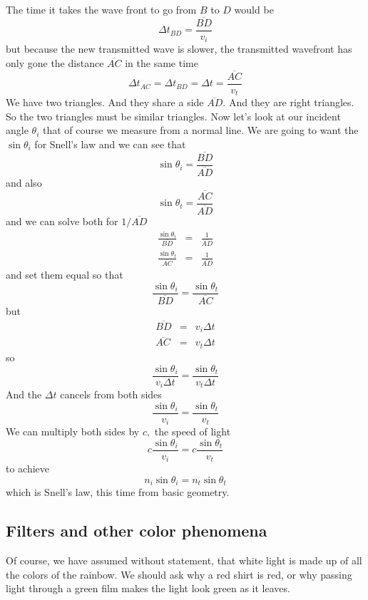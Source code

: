 \documentclass{article}
\begin{document}
The time it takes the wave front
to go from $B$ to $D$ would be 
\[
\Delta t_{BD}=\frac{\overline{BD}}{v_{i}}
\]%
but because the new transmitted wave is slower, the transmitted wavefront
has only gone the distance $\overline{AC}$ in the same time%
\[
\Delta t_{AC}=\Delta t_{BD}=\Delta t=\frac{\overline{AC}}{v_{t}}
\]%
We have two triangles. And they share a side $\overline{AD}.$ And they are
right triangles. So the two triangles must be similar triangles. Now let's
look at our incident angle $\theta _{i}$ that of course we measure from a
normal line. We are going to want the $\sin \theta _{i}$ for Snell's law and
we can see that 
\[
\sin \theta _{i}=\frac{\overline{BD}}{\overline{AD}}
\]%
and also 
\[
\sin \theta _{t}=\frac{\overline{AC}}{\overline{AD}}
\]%
and we can solve both for $1/\overline{AD}$ 
\begin{eqnarray*}
\frac{\sin \theta _{i}}{\overline{BD}} &=&\frac{1}{\overline{AD}} \\
\frac{\sin \theta _{t}}{\overline{AC}} &=&\frac{1}{\overline{AD}}
\end{eqnarray*}%
and set them equal so that 
\[
\frac{\sin \theta _{i}}{\overline{BD}}=\frac{\sin \theta _{t}}{\overline{AC}}
\]%
but 
\begin{eqnarray*}
\overline{BD} &=&v_{i}\Delta t \\
\overline{AC} &=&v_{t}\Delta t
\end{eqnarray*}%
so 
\[
\frac{\sin \theta _{i}}{v_{i}\Delta t}=\frac{\sin \theta _{t}}{v_{t}\Delta t}
\]%
And the $\Delta t$ cancels from both sides%
\[
\frac{\sin \theta _{i}}{v_{i}}=\frac{\sin \theta _{t}}{v_{t}}
\]%
We can multiply both sides by $c,$ the speed of light 
\[
c\frac{\sin \theta _{i}}{v_{i}}=c\frac{\sin \theta _{t}}{v_{t}}
\]%
to achieve%
\[
n_{i}\sin \theta _{i}=n_{t}\sin \theta _{t}
\]%
which is Snell's law, this time from basic geometry.

\subsection{Filters and other color phenomena}

Of course, we have assumed without statement, that white light is made up of
all the colors of the rainbow. We should ask why a red shirt is red, or why
passing light through a green film makes the light look green as it leaves.
\end{document}

